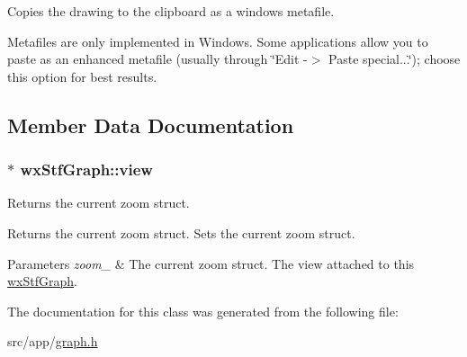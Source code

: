Copies the drawing to the clipboard as a windows metafile. 

Metafiles are only implemented in Windows. Some applications allow you to paste as an enhanced metafile (usually through \char`\"{}Edit -\/$>$ Paste special...\char`\"{}); choose this option for best results. 

\subsection{Member Data Documentation}
\hypertarget{classwxStfGraph_aec59dd5424523ad7c8cf42bee83f95d6}{
\subsubsection[{view}]{$\ast$ {\bf wxStfGraph::view}}}
\label{classwxStfGraph_aec59dd5424523ad7c8cf42bee83f95d6}


Returns the current zoom struct. 

\begin{DoxyReturn}{Returns}
the current zoom struct. Sets the current zoom struct.
\end{DoxyReturn}

\begin{DoxyParams}{Parameters}
{\em zoom\_\-} & The current zoom struct. The view attached to this \hyperlink{classwxStfGraph}{wxStfGraph}. \\
\hline
\end{DoxyParams}


The documentation for this class was generated from the following file:\begin{DoxyCompactItemize}
\item 
src/app/\hyperlink{graph_8h}{graph.h}\end{DoxyCompactItemize}
